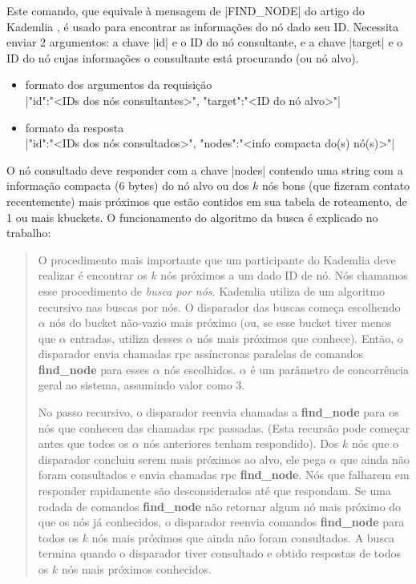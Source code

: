 
\newpage
{}

Este comando, que equivale à mensagem de \bverb|FIND\_NODE| do artigo do Kademlia
\cite{artigo:kademlia}, é usado para encontrar as informações do nó dado seu ID.
Necessita enviar 2 argumentos: a chave \bverb|id| e o ID do nó consultante, e a chave
\bverb|target| e o ID do nó cujas informações o consultante está procurando (ou nó
alvo).

\begin{itemize}
    \item formato dos argumentos da requisição \\
        \sverb|{"id":"<IDs dos nós consultantes>", "target":"<ID do nó alvo>"}|

    \item formato da resposta \\
        \sverb|{"id":"<IDs dos nós consultados>", "nodes":"<info compacta do(s) nó(s)>"}|
\end{itemize}

O nó consultado deve responder com a chave \bverb|nodes| contendo uma
\gls*{string} com a informação compacta (6 bytes) do nó alvo ou dos $k$ nós bons (que
fizeram contato recentemente) mais próximos que estão contidos em sua tabela de
roteamento, de 1 ou mais \glspl*{kbucket}. O funcionamento do algoritmo da busca é
explicado no trabalho:

\blockquote{O procedimento mais importante que um participante do Kademlia deve realizar
é encontrar os $k$ nós próximos a um dado ID de nó. Nós chamamos esse procedimento de
\emph{busca por nós}. Kademlia utiliza de um algoritmo recursivo nas buscas por nós. O
disparador das buscas começa escolhendo $\alpha$ nós do \gls*{bucket} não-vazio mais
próximo (ou, se esse \gls*{bucket} tiver menos que $\alpha$ entradas, utiliza desses
$\alpha$ nós mais próximos que conhece). Então, o disparador envia chamadas \gls*{rpc}
assíncronas paralelas de comandos \textbf{find\_node} para esses $\alpha$ nós
escolhidos. $\alpha$ é um parâmetro de concorrência geral ao sistema, assumindo valor
como 3.

No passo recursivo, o disparador reenvia chamadas a \textbf{find\_node} para os nós que
conheceu das chamadas \gls*{rpc} passadas. (Esta recursão pode começar antes que todos
os $\alpha$ nós anteriores tenham respondido). Dos $k$ nós que o disparador concluiu
serem mais próximos ao alvo, ele pega $\alpha$ que ainda não foram consultados e envia
chamadas \gls*{rpc} \textbf{find\_node}. Nós que falharem em responder rapidamente são
desconsiderados até que respondam. Se uma rodada de comandos \textbf{find\_node} não
retornar algum nó mais próximo do que os nós já conhecidos, o disparador reenvia
comandos \textbf{find\_node} para todos os $k$ nós mais próximos que ainda não foram
consultados. A busca termina quando o disparador tiver consultado e obtido respostas de
todos os $k$ nós mais próximos conhecidos.}

